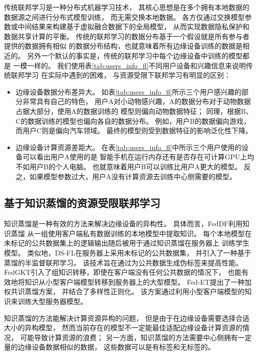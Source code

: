 传统联邦学习是一种分布式机器学习技术，
其核心思想是在多个拥有本地数据的数据源之间进行分布式模型训练，
而无需交换本地数据。
各方仅通过交换模型参数或中间结果来构建基于虚拟融合数据下的全局模型，
从而实现数据隐私保护和数据共享计算的平衡。
传统的联邦学习的数据分布基于一个假设就是所有参与者提供的数据拥有相似
的数据分布结构，也就意味着所有边缘设备训练的数据是相近的。
另外一个默认的事实是，传统的联邦学习中每个边缘设备中训练的模型都是
一模一样的。
我们使用表\ref{tab:users_info_fl}不同用户设备和兴趣信息来说明传统联邦学习
在实际中遇到的困难，
与资源受限下联邦学习有明显的区别：
\begin{itemize}
    \item 边缘设备数据分布差异大。
    如表\ref{tab:users_info_fl}所示三个用户感兴趣的部分非常具有自己的特色，
    用户A对小动物感兴趣，A的数据分布对于动物数据占据大部分，使用A的数据训练的
    模型则偏向动物数据特征；
    同理，根据B、C的数据训练的模型也偏向各自的数据分布。
    例如，用户B的数据偏向游戏，而用户C则是偏向汽车领域。
    最终的模型则受到数据特征的影响泛化性下降。
    \item 边缘设备计算资源差距大。
    在表\ref{tab:users_info_fl}中所示三个用户使用的设备可以看出用户A使用的是
    智能手机\cite{kamal2018three}在运行内存还有是否存在可计算GPU上均不如用户B的个人电脑。
    也就意味着用户B可以训练比用户A更大的模型。
    反之，如果模型参数过大，用户A没有计算资源去训练中心侧需要的模型。

\end{itemize}

\subsection{基于知识蒸馏的资源受限联邦学习}
知识蒸馏是一种有效的方法来解决边缘设备的异构性\cite{gou2021knowledge}。
具体而言，FedDF\cite{DBLP:conf/nips/LinKSJ20}利用知识蒸馏
从一组使用客户端私有数据训练的本地模型中提取知识。
每个本地模型在未标记的公共数据集上的逻辑输出随后被用于通过知识蒸馏在服务器上
训练学生模型。
类似地，DS-FL\cite{itahara2021distillation}在服务器上采用未标记的公共数据集，
并引入了一种基于蒸馏的半监督联邦学习。
该技术旨在通过为公共数据生成伪标签来提高性能。
FedGKT\cite{he2020group}引入了组知识转移，即使在客户端没有任何公共数据的情况下，
也能有效地将知识从小型客户端模型转移到服务器上的大型模型。
Fed-ET\cite{cho2022heterogeneous}提出了一种加权共识蒸馏方案，
并结合了多样性正则化。
该方案通过利用小型客户端模型的知识来训练大型服务器模型。

知识蒸馏的方法能解决计算资源异构的问题，
但是由于在边缘设备需要选择合适大小的异构模型，
然而当前存在的模型不一定能最佳适配边缘设备计算资源的情况，
可能导致计算资源的浪费；
另一方面，知识蒸馏的方法需要中心侧拥有一定量的边缘设备数据相似的数据，
这些数据可以是有标签和无标签的。


